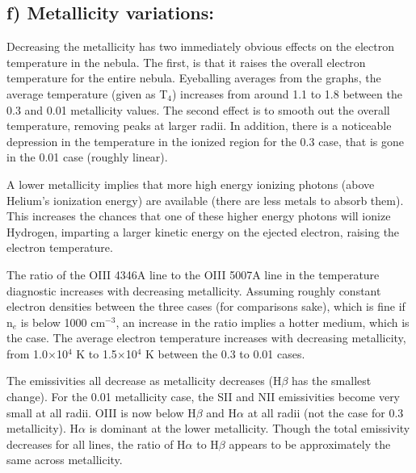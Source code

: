 \documentclass[a4paper]{article}
\begin{document}
\subsection{f) Metallicity variations:}
Decreasing the metallicity has two immediately obvious effects on the electron temperature in
the nebula. The first, is that it raises the overall electron temperature for the entire nebula.
Eyeballing averages from the graphs, the average temperature (given as T$_{4}$) increases
from around 1.1 to 1.8 between the 0.3 and 0.01 metallicity values. The second effect is 
to smooth out the overall temperature, removing peaks at larger radii. In addition, there is 
a noticeable depression in the temperature in the ionized region for the 0.3 case, that
is gone in the 0.01 case (roughly linear).

A lower metallicity implies that 
more high energy ionizing photons (above Helium's ionization energy) are 
available (there are less metals to absorb them). This increases the chances 
that one of these higher energy photons will ionize Hydrogen, imparting a larger
kinetic energy on the ejected electron, raising the electron temperature. 

The ratio of the OIII 4346A line to the OIII 5007A line in the temperature diagnostic
increases with decreasing metallicity. Assuming roughly constant electron densities
between the three cases (for comparisons sake), which is fine if n$_{e}$ is below 1000 
cm$^{-3}$, an increase in the ratio implies a hotter medium, which is the case. The
average electron temperature increases with decreasing metallicity, from 1.0$\times$10$^{4}$ K
to 1.5$\times$10$^{4}$ K between the 0.3 to 0.01 cases.

The emissivities all decrease as metallicity decreases (H$\beta$ has the smallest change).
For the 0.01 metallicity case, the SII and NII emissivities become very small at all radii. OIII
is now below H$\beta$ and H$\alpha$ at all radii (not the case for 0.3 metallicity).
H$\alpha$ is dominant at the lower metallicity. Though the total emissivity decreases for all lines,
the ratio of H$\alpha$ to H$\beta$ appears to be approximately the same across metallicity.
\end{document}
